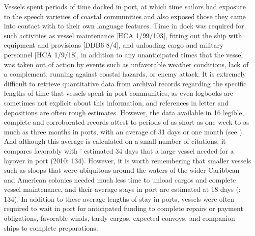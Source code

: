 Vessels spent periods of time docked in port, at which time sailors had exposure to the speech varieties of coastal communities and also exposed those they came into contact with to their own language features. Time in dock was required for such activities as vessel maintenance [HCA 1/99/103], fitting out the ship with equipment and provisions [DDB6 8/4], and unloading cargo and military personnel [HCA 1/9/18], in addition to any unanticipated times that the vessel was taken out of action by events such as unfavorable weather conditions, lack of a  complement, running against coastal hazards, or enemy attack. It is extremely difficult to retrieve quantitative data from archival records regarding the specific lengths of time that vessels spent in port communities, as even logbooks are sometimes not explicit about this information, and references in letter and depositions are often rough estimates. However, the data available in 16 legible, complete and corroborated records attest to periods of as short as one week to as much as three months in ports, with an average of 31 days or one month (see ). And although this average is calculated on a small number of citations, it compares favorably with \citeauthor{Jarvis2010}’ estimated 34 days that a large vessel needed for a layover in port (2010: 134). However, it is worth remembering that smaller vessels such as sloops that were ubiquitous around the waters of the wider Caribbean and American colonies needed much less time to unload cargos and complete vessel maintenance, and their average stays in port are estimated at 18 days (\citealt{Jarvis2010}: 134). In addition to these average lengths of stay in ports, vessels were often required to wait in port for anticipated funding to complete repairs or payment obligations, favorable winds, tardy cargos, expected convoys, and companion ships to complete preparations. 


